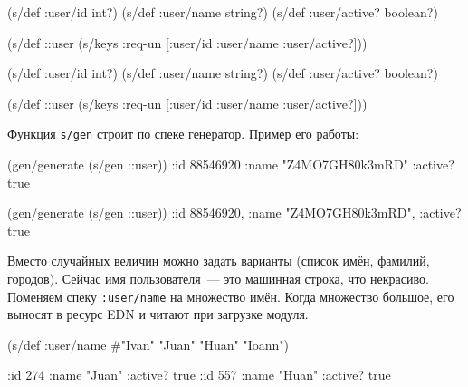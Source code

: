 \ifx\devicetype\mobile

\begin{english}
  \begin{clojure}
(s/def :user/id int?)
(s/def :user/name string?)
(s/def :user/active? boolean?)

(s/def ::user
  (s/keys :req-un [:user/id
                   :user/name
                   :user/active?]))
  \end{clojure}
\end{english}

\else

\begin{english}
  \begin{clojure}
(s/def :user/id int?)
(s/def :user/name string?)
(s/def :user/active? boolean?)

(s/def ::user (s/keys :req-un [:user/id
                               :user/name
                               :user/active?]))
  \end{clojure}
\end{english}

\fi

\noindent
Функция \verb|s/gen| строит по спеке генератор. Пример его работы:

\ifx\devicetype\mobile

\begin{english}
  \begin{clojure}
(gen/generate (s/gen ::user))
{:id 88546920
 :name "Z4MO7GH80k3mRD"
 :active? true}
  \end{clojure}
\end{english}

\else

\begin{english}
  \begin{clojure}
(gen/generate (s/gen ::user))
{:id 88546920, :name "Z4MO7GH80k3mRD", :active? true}
  \end{clojure}
\end{english}

\fi

Вместо случайных величин можно задать варианты (список имён, фамилий,
городов). Сейчас имя пользователя~--- это машинная строка, что некрасиво. Поменяем
спеку \verb|:user/name| на множество имён. Когда множество большое, его выносят
в ресурс EDN и читают при загрузке модуля.

\ifx\devicetype\mobile

\begin{english}
  \begin{clojure}
(s/def :user/name
  #{"Ivan" "Juan" "Huan" "Ioann"})

{:id 274 :name "Juan" :active? true}
{:id 557 :name "Huan" :active? true}
  \end{clojure}
\end{english}

